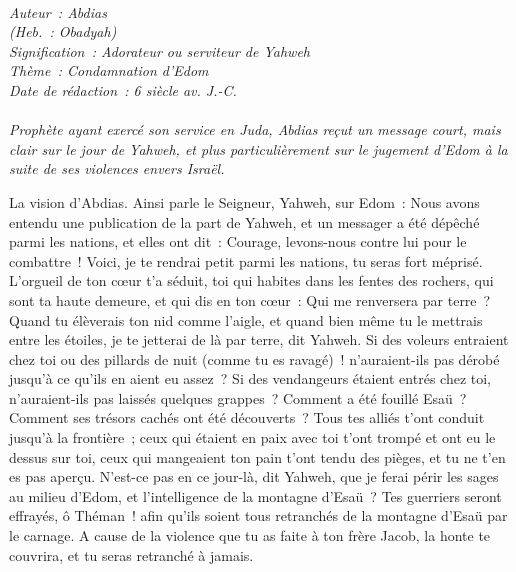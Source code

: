 \BFont
\noindent\hrulefill
{\footnotesize
\textit{
\bigskip
{\centering{}
\\Auteur~: Abdias
\\(Heb.~: Obadyah)
\\Signification~: Adorateur ou serviteur de Yahweh
\\Thème~: Condamnation d'Edom
\\Date de rédaction~: 6 siècle av. J.-C.\\}
}
\textit{
\\Prophète ayant exercé son service en Juda, Abdias reçut un message court, mais clair sur le jour de Yahweh, et plus particulièrement sur le jugement d'Edom à la suite de ses violences envers Israël.\bigskip
}
}
\par\nobreak\noindent\hrulefill
\begin{multicols}{2}
\VerseOne{}La vision d'Abdias. Ainsi parle le Seigneur, Yahweh, sur Edom~: Nous avons entendu une publication de la part de Yahweh, et un messager a été dépêché parmi les nations, et elles ont dit~: Courage, levons-nous contre lui pour le combattre~!
Voici, je te rendrai petit parmi les nations, tu seras fort méprisé.
L'orgueil de ton cœur t'a séduit, toi qui habites dans les fentes des rochers, qui sont ta haute demeure, et qui dis en ton cœur~: Qui me renversera par terre~?
Quand tu élèverais ton nid comme l'aigle, et quand bien même tu le mettrais entre les étoiles, je te jetterai de là par terre, dit Yahweh.
Si des voleurs entraient chez toi ou des pillards de nuit (comme tu es ravagé)~! n'auraient-ils pas dérobé jusqu'à ce qu'ils en aient eu assez~? Si des vendangeurs étaient entrés chez toi, n'auraient-ils pas laissés quelques grappes~?
Comment a été fouillé Esaü~? Comment ses trésors cachés ont été découverts~?
Tous tes alliés t'ont conduit jusqu'à la frontière~; ceux qui étaient en paix avec toi t'ont trompé et ont eu le dessus sur toi, ceux qui mangeaient ton pain t'ont tendu des pièges, et tu ne t'en es pas aperçu.
N'est-ce pas en ce jour-là, dit Yahweh, que je ferai périr les sages au milieu d'Edom, et l'intelligence de la montagne d'Esaü~?
Tes guerriers seront effrayés, ô Théman~! afin qu'ils soient tous retranchés de la montagne d'Esaü par le carnage.
A cause de la violence que tu as faite à ton frère Jacob, la honte te couvrira, et tu seras retranché à jamais.

\end{multicols}
